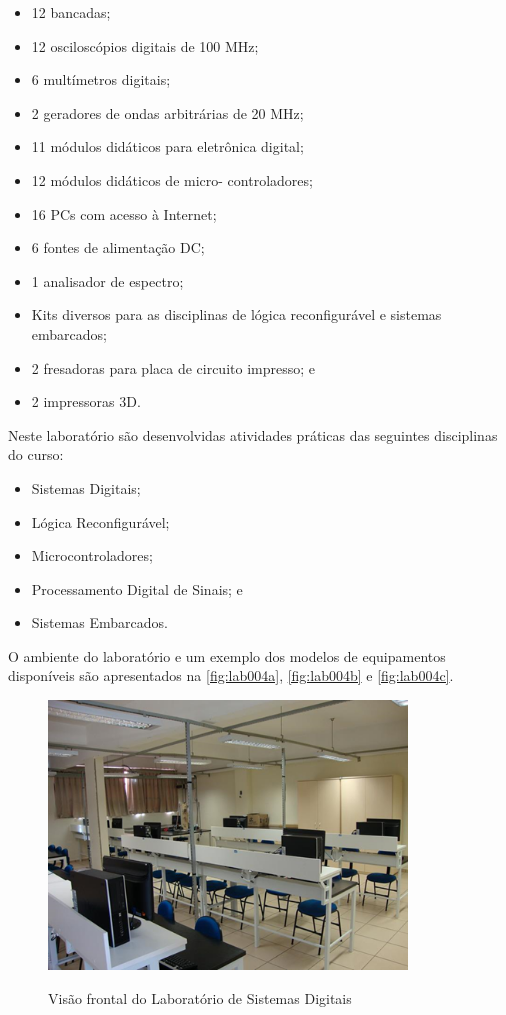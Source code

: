 \begin{itemize}
    \item 12 bancadas;
    \item 12 osciloscópios digitais de 100 MHz;
    \item 6 multímetros digitais;
    \item 2 geradores de ondas arbitrárias de 20 MHz;
    \item 11 módulos didáticos para eletrônica digital; 
    \item 12 módulos didáticos de micro- controladores; 
    \item 16 PCs com acesso à Internet; 
    \item 6 fontes de alimentação DC;
    \item 1 analisador de espectro;
    \item Kits diversos para as disciplinas de lógica reconfigurável e sistemas embarcados;
    \item 2 fresadoras para placa de circuito impresso; e
    \item 2 impressoras 3D.   
\end{itemize}

Neste laboratório são desenvolvidas atividades práticas das seguintes disciplinas do curso:

\begin{itemize}
    \item Sistemas Digitais;
    \item Lógica Reconfigurável;
    \item Microcontroladores;
    \item Processamento Digital de Sinais; e
    \item Sistemas Embarcados.    
\end{itemize}

O ambiente do laboratório e um exemplo dos modelos de equipamentos disponíveis são apresentados na \autoref{fig:lab004a}, \autoref{fig:lab004b} e \autoref{fig:lab004c}.

\begin{figure}[!htb]
    \centering
    \caption{Visão frontal do Laboratório de Sistemas Digitais}
    \includegraphics[width=0.85\textwidth]{Caps/Figs/lab004a.png}
    \fonte{\utf}
    \label{fig:lab004a}
\end{figure}

